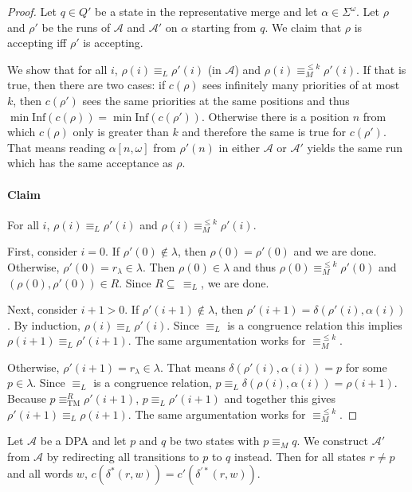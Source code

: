\begin{proof}
	Let $q \in Q'$ be a state in the representative merge and let $\alpha \in \Sigma^\omega$. Let $\rho$ and $\rho'$ be the runs of $\mathcal{A}$ and $\mathcal{A}'$ on $\alpha$ starting from $q$. We claim that $\rho$ is accepting iff $\rho'$ is accepting.
	
	We show that for all $i$, $\rho(i) \equiv_L \rho'(i)$ (in $\mathcal{A}$) and $\rho(i) \equiv_M^{\leq k} \rho'(i)$. If that is true, then there are two cases: if $c(\rho)$ sees infinitely many priorities of at most $k$, then $c(\rho')$ sees the same priorities at the same positions and thus $\min \text{Inf}(c(\rho)) = \min \text{Inf}(c(\rho'))$. Otherwise there is a position $n$ from which $c(\rho)$ only is greater than $k$ and therefore the same is true for $c(\rho')$. That means reading $\alpha[n,\omega]$ from $\rho'(n)$ in either $\mathcal{A}$ or $\mathcal{A}'$ yields the same run which has the same acceptance as $\rho$.
	
	\paragraph{Claim} For all $i$, $\rho(i) \equiv_L \rho'(i)$ and $\rho(i) \equiv_M^{\leq k} \rho'(i)$.
	
	First, consider $i = 0$. If $\rho'(0) \notin \lambda$, then $\rho(0) = \rho'(0)$ and we are done. Otherwise, $\rho'(0) = r_\lambda \in \lambda$. Then $\rho(0) \in \lambda$ and thus $\rho(0) \equiv_M^{\leq k} \rho'(0)$ and $(\rho(0), \rho'(0)) \in R$. Since $R \subseteq \,\equiv_L$, we are done.
	
	Next, consider $i+1 > 0$. If $\rho'(i+1) \notin \lambda$, then $\rho'(i+1) = \delta(\rho'(i), \alpha(i))$. By induction, $\rho(i) \equiv_L \rho'(i)$. Since $\equiv_L$ is a congruence relation this implies $\rho(i+1) \equiv_L \rho'(i+1)$. The same argumentation works for $\equiv_M^{\leq k}$.
	
	Otherwise, $\rho'(i+1) = r_\lambda \in \lambda$. That means $\delta(\rho'(i), \alpha(i)) = p$ for some $p \in \lambda$. Since $\equiv_L$ is a congruence relation, $p \equiv_L \delta(\rho(i), \alpha(i)) = \rho(i+1)$. Because $p \equiv_\text{TM}^R \rho'(i+1)$, $p \equiv_L \rho'(i+1)$ and together this gives $\rho'(i+1) \equiv_L \rho(i+1)$. The same argumentation works for $\equiv_M^{\leq k}$.
\end{proof}

\begin{lem}
	Let $\mathcal{A}$ be a DPA and let $p$ and $q$ be two states with $p \equiv_M q$. We construct $\mathcal{A}'$ from $\mathcal{A}$ by redirecting all transitions to $p$ to $q$ instead. Then for all states $r \neq p$ and all words $w$, $c(\delta^*(r, w)) = c'(\delta^{\prime *}(r, w))$.
	\label{lem:tremoore:moore_redirect_is_ok}
\end{lem}

